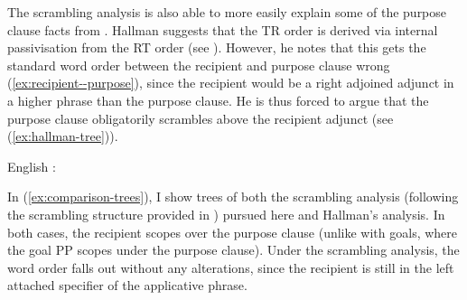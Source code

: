 The scrambling analysis is also able to more easily explain some of the purpose clause facts from \citet{Hallman.2015}. Hallman suggests that the TR order is derived via internal passivisation from the RT order (see \citet{Larson.1988}). However, he notes that this gets the standard word order between the recipient and purpose clause wrong (\ref{ex:recipient--purpose}), since the recipient would be a right adjoined adjunct in a higher phrase than the purpose clause. He is thus forced to argue that the purpose clause obligatorily scrambles above the recipient adjunct (see (\ref{ex:hallman-tree})).

\begin{exe}
	\ex \label{ex:recipient--purpose} English \citep[ex 25]{Hallman.2015}:\label{ex:en-purpose-order}
	\begin{xlist}
	\end{xlist}
\end{exe}

In (\ref{ex:comparison-trees}), I show trees of both the scrambling analysis (following the scrambling structure provided in \cite{McGinnis.1998}) pursued here and Hallman's analysis. In both cases, the recipient scopes over the purpose clause (unlike with goals, where the goal PP scopes under the purpose clause). Under the scrambling analysis, the word order falls out without any alterations, since the recipient is still in the left attached specifier of the applicative phrase.

